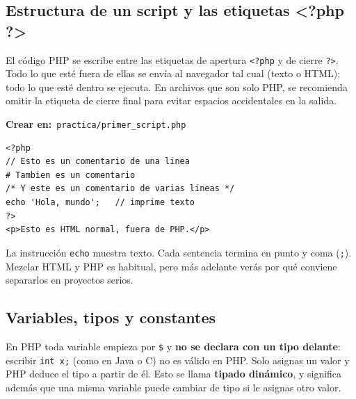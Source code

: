 \documentclass[11pt]{article}
\begin{document}
\subsection{Estructura de un script y las etiquetas \textless{}?php ?\textgreater{}}
El código PHP se escribe entre las etiquetas de apertura \texttt{\textless{}?\allowbreak{}php} y de cierre \texttt{?\allowbreak{}\textgreater{}}. Todo lo que esté fuera de ellas se envía al navegador tal cual (texto o HTML); todo lo que esté dentro se ejecuta. En archivos que son solo PHP, se recomienda omitir la etiqueta de cierre final para evitar espacios accidentales en la salida.

{\small\color{phpazulo}\textbf{Crear en:}~}\texttt{practica/\allowbreak{}primer\_script.\allowbreak{}php}\par\nobreak\vspace{-1pt}
\begin{cajacodigo}
\begin{lstlisting}[style=php]
<?php
// Esto es un comentario de una linea
# Tambien es un comentario
/* Y este es un comentario de varias lineas */
echo 'Hola, mundo';   // imprime texto
?>
<p>Esto es HTML normal, fuera de PHP.</p>
\end{lstlisting}
\end{cajacodigo}
\vspace{2pt}
La instrucción \texttt{echo} muestra texto. Cada sentencia termina en punto y coma (\texttt{;\allowbreak{}}). Mezclar HTML y PHP es habitual, pero más adelante verás por qué conviene separarlos en proyectos serios.

\subsection{Variables, tipos y constantes}
En PHP toda variable empieza por \texttt{\$} y \textbf{no se declara con un tipo delante}: escribir \texttt{int x;\allowbreak{}} (como en Java o C) no es válido en PHP. Solo asignas un valor y PHP deduce el tipo a partir de él. Esto se llama \textbf{tipado dinámico}, y significa además que una misma variable puede cambiar de tipo si le asignas otro valor.
\end{document}
